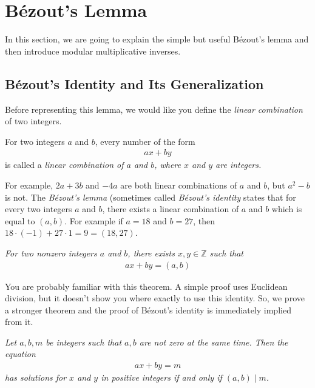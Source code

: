 \documentclass{subfile}
\begin{document}
	\section{B\'{e}zout's Lemma}

	In this section, we are going to explain the simple but useful B\'{e}zout's lemma and then introduce modular multiplicative inverses.

	\subsection{B\'{e}zout's Identity and Its Generalization}
	Before representing this lemma, we would like you define the \textit{linear combination} of two integers.

	\begin{definition}\label{def:linearcombination}
		For two integers $a$ and $b$, every number of the form
		\begin{align*} ax+by\end{align*}
		is called a \itshape{linear combination} of $a$ and $b$, where $x$ and $y$ are integers.
	\end{definition}

	For example, $2a+3b$ and $-4a$ are both linear combinations of $a$ and $b$, but $a^2-b$ is not. The \textit{B\'{e}zout's lemma} (sometimes called \textit{B\'{e}zout's identity} states that for every two integers $a$ and $b$, there exists a linear combination of $a$ and $b$ which is equal to $(a,b)$. For example if $a=18$ and $b=27$, then $18 \cdot (-1) + 27 \cdot 1 = 9 =(18,27)$.

	\begin{theorem}  \slshape
		For two nonzero integers $a$ and $b$, there exists $x, y \in \mathbb Z$ such that
		\begin{align*}
		ax+by = (a,b)
		\end{align*}
	\end{theorem}

	You are probably familiar with this theorem. A simple proof uses Euclidean division, but it doesn't show you where exactly to use this identity. So, we prove a stronger theorem and the proof of B\'{e}zout's identity is immediately implied from it.

	\begin{theorem}\slshape \label{thm:equationgcd}
		Let $a,b,m$ be integers such that $a, b$ are not zero at the same time. Then the equation
		\begin{align*} ax + by = m\end{align*}
		has solutions for $x$ and $y$ in positive integers if and only if $(a,b)\mid m$.
	\end{theorem}
\end{document}
